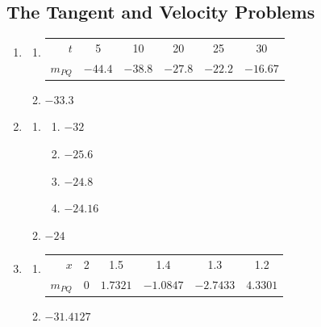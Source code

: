 \documentclass{article}
\begin{document}
\subsection{The Tangent and Velocity Problems}
\begin{enumerate}
  \item \begin{enumerate}[label=(\alph*)]
          \item \begin{tabular}{rccccc}
                  \toprule
                  $t$      & 5       & 10      & 20      & 25      & 30       \\
                  $m_{PQ}$ & $-44.4$ & $-38.8$ & $-27.8$ & $-22.2$ & $-16.67$ \\
                  \bottomrule
                \end{tabular}
          \item $-33.3$
        \end{enumerate}
        \setcounter{enumi}{4}
  \item \begin{enumerate}[label=(\alph*)]
          \item \begin{enumerate}[label=(\roman*)]
                  \item $-32$
                  \item $-25.6$
                  \item $-24.8$
                  \item $-24.16$
                \end{enumerate}
          \item $-24$
        \end{enumerate}
        \setcounter{enumi}{8}
  \item \begin{enumerate}[label=(\alph*)]
          \item \begin{tabular}{rccccc}
                  \toprule
                  $x$      & 2 & 1.5      & 1.4       & 1.3       & 1.2      \\
                  $m_{PQ}$ & 0 & $1.7321$ & $-1.0847$ & $-2.7433$ & $4.3301$ \\
                  \bottomrule
                \end{tabular}
          \item $-31.4127$
        \end{enumerate}
\end{enumerate}
\end{document}
